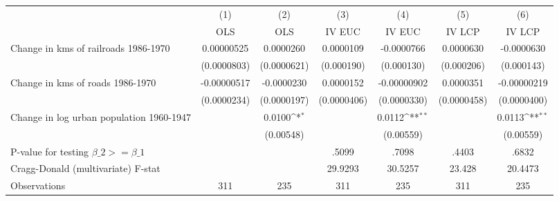 {
\def\sym#1{\ifmmode^{#1}\else\(^{#1}\)\fi}
\begin{tabular}{l*{6}{c}}
\hline\hline
                &\multicolumn{1}{c}{(1)}&\multicolumn{1}{c}{(2)}&\multicolumn{1}{c}{(3)}&\multicolumn{1}{c}{(4)}&\multicolumn{1}{c}{(5)}&\multicolumn{1}{c}{(6)}\\
                &\multicolumn{1}{c}{OLS}&\multicolumn{1}{c}{OLS}&\multicolumn{1}{c}{IV EUC}&\multicolumn{1}{c}{IV EUC}&\multicolumn{1}{c}{IV LCP}&\multicolumn{1}{c}{IV LCP}\\
\hline
Change in kms of railroads 1986-1970&0.00000525         &0.0000260         &0.0000109         &-0.0000766         &0.0000630         &-0.0000630         \\
                &(0.0000803)         &(0.0000621)         &(0.000190)         &(0.000130)         &(0.000206)         &(0.000143)         \\
[1em]
Change in kms of roads 1986-1970&-0.00000517         &-0.0000230         &0.0000152         &-0.00000902         &0.0000351         &-0.00000219         \\
                &(0.0000234)         &(0.0000197)         &(0.0000406)         &(0.0000330)         &(0.0000458)         &(0.0000400)         \\
[1em]
Change in log urban population 1960-1947&                  &   0.0100\sym{*}  &                  &   0.0112\sym{**} &                  &   0.0113\sym{**} \\
                &                  &(0.00548)         &                  &(0.00559)         &                  &(0.00559)         \\
\hline
P-value for testing $\beta\_{2} >= \beta\_{1}$&                  &                  &    .5099         &    .7098         &    .4403         &    .6832         \\
Cragg-Donald (multivariate) F-stat&                  &                  &  29.9293         &  30.5257         &   23.428         &  20.4473         \\
Observations    &      311         &      235         &      311         &      235         &      311         &      235         \\
\hline\hline
\end{tabular}
}
